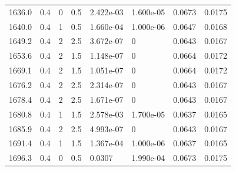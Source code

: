\documentclass[preview]{standalone}
\begin{document}
{{{\begin{tabular}{L{1.2cm}C{1.2cm} C{0.3cm}C{0.5cm} C{1.4cm}C{1.4cm} C{1.4cm}C{1.4cm}}
  1636.0  &   0.4  & 0     & 0.5 &  2.422e-03  & 1.600e-05  & 0.0673 &  0.0175   \\ 
  1640.0  &   0.4  & 1     & 0.5 &  1.660e-04  & 1.000e-06  & 0.0647 &  0.0168   \\ 
  1649.2  &   0.4  & 2     & 2.5 &  3.672e-07  & 0  & 0.0643 &  0.0167   \\ 
  1653.6  &   0.4  & 2     & 1.5 &  1.148e-07  & 0  & 0.0664 &  0.0172   \\ 
  1669.1  &   0.4  & 2     & 1.5 &  1.051e-07  & 0  & 0.0664 &  0.0172   \\ 
  1676.2  &   0.4  & 2     & 2.5 &  2.314e-07  & 0  & 0.0643 &  0.0167   \\ 
  1678.4  &   0.4  & 2     & 2.5 &  1.671e-07  & 0  & 0.0643 &  0.0167   \\ 
  1680.8  &   0.4  & 1     & 1.5 &  2.578e-03  & 1.700e-05  & 0.0637 &  0.0165   \\ 
  1685.9  &   0.4  & 2     & 2.5 &  4.993e-07  & 0  & 0.0643 &  0.0167   \\ 
  1691.4  &   0.4  & 1     & 1.5 &  1.367e-04  & 1.000e-06  & 0.0637 &  0.0165   \\ 
  1696.3  &   0.4  & 0     & 0.5 &  0.0307  & 1.990e-04  & 0.0673 &  0.0175   \\ 
\hline 
\end{tabular} 

}}}
\end{document}
